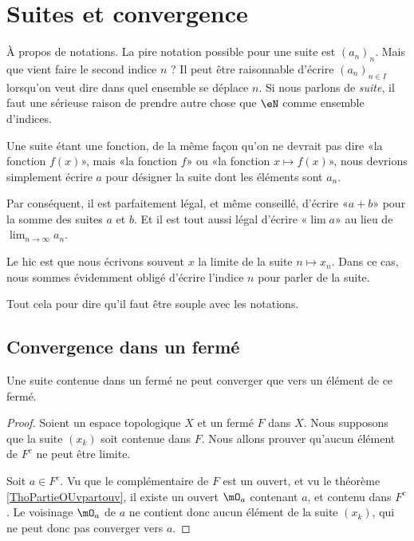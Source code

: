 \section{Suites et convergence}

\begin{normaltext}
    À propos de notations. La pire notation possible pour une suite est \( (a_n)_n\). Mais que vient faire le second indice \( n\) ? Il peut être raisonnable d'écrire \( (a_n)_{n\in I}\) lorsqu'on veut dire dans quel ensemble se déplace \( n\). Si nous parlons de \emph{suite}, il faut une sérieuse raison de prendre autre chose que \( \eN\) comme ensemble d'indices.

    Une suite étant une fonction, de la même façon qu'on ne devrait pas dire «la fonction \( f(x)\)», mais «la fonction \( f\)» ou «la fonction \( x\mapsto f(x)\)», nous devrions simplement écrire \( a\) pour désigner la suite dont les éléments sont \( a_n\). 

    Par conséquent, il est parfaitement légal, et même conseillé, d'écrire «\( a+b\)» pour la somme des suites \( a\) et \( b\). Et il est tout aussi légal d'écrire «\( \lim a\)» au lieu de \( \lim_{n\to \infty} a_n\).

    Le hic est que nous écrivons souvent \( x\) la limite de la suite \( n\mapsto x_n\). Dans ce cas, nous sommes évidemment obligé d'écrire l'indice \( n\) pour parler de la suite.

    Tout cela pour dire qu'il faut être souple avec les notations.
\end{normaltext}

\subsection{Convergence dans un fermé}

\begin{proposition}      \label{PROPooBBNSooCjrtRb}
    Une suite contenue dans un fermé ne peut converger que vers un élément de ce fermé.
\end{proposition}

\begin{proof}
    Soient un espace topologique \( X\) et un fermé \( F\) dans \( X\). Nous supposons que la suite \( (x_k)\) soit contenue dans \( F\). Nous allons prouver qu'aucun élément de \( F^c\) ne peut être limite.

    Soit \( a \in F^c\). Vu que le complémentaire de \( F\) est un ouvert, et vu le théorème \ref{ThoPartieOUvpartouv}, il existe un ouvert \( \mO_a\) contenant \( a\), et contenu dans \( F^c\). Le voisinage \( \mO_a\) de \( a\) ne contient donc aucun élément de la suite \( (x_k)\), qui ne peut donc pas converger vers \( a\).
\end{proof}

